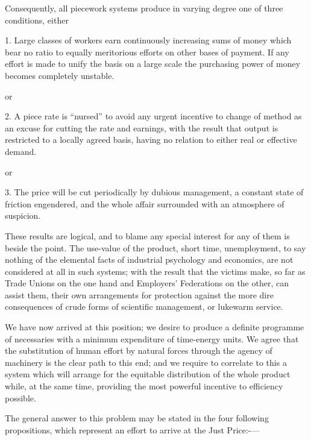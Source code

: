 \documentclass{book}
\begin{document}
Consequently, all piecework systems produce in varying degree one of three conditions, either

1. Large classes of workers earn continuously increasing sums of money which bear no ratio to equally meritorious efforts on other bases of payment. If any effort is made to unify the basis on a large scale the purchasing power of money becomes completely unstable.

or

2. A piece rate is “nursed” to avoid any urgent incentive to change of method as an excuse for cutting the rate and earnings, with the result that output is restricted to a locally agreed basis, having no relation to either real or effective demand.

or

3. The price will be cut periodically by dubious management, a constant state of friction engendered, and the whole affair surrounded with an atmosphere of suspicion.

These results are logical, and to blame any special interest for any of them is beside the point. The use-value of the product, short time, unemployment, to say nothing of the elemental facts of industrial psychology and economics, are not considered at all in such systems; with the result that the victims make, so far as Trade Unions on the one hand and Employers’ Federations on the other, can assist them, their own arrangements for protection against the more dire consequences of crude forms of scientific management, or lukewarm service.

We have now arrived at this position; we desire to produce a definite programme of necessaries with a minimum expenditure of time-energy units. We agree that the substitution of human effort by natural forces through the agency of machinery is the clear path to this end; and we require to correlate to this a system which will arrange for the equitable distribution of the whole product while, at the same time, providing the most powerful incentive to efficiency possible.

The general answer to this problem may be stated in the four following propositions, which represent an effort to arrive at the Just Price:-—
\end{document}
